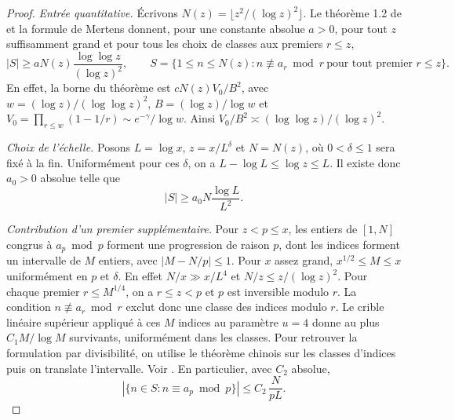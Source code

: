 \documentclass[11pt,a4paper]{article}
\begin{document}
\begin{proof}
\emph{Entrée quantitative.}
Écrivons $N(z)=\lfloor z^2/(\log z)^2\rfloor$. Le théorème 1.2 de
\cite{survivors} et la formule de Mertens donnent, pour une constante
absolue $a>0$, pour tout $z$ suffisamment grand et pour tous les choix de
classes aux premiers $r\le z$,
\[
 |S| \ge a N(z) \frac{\log\log z}{(\log z)^2},
 \qquad S=\{1\le n\le N(z): n\not\equiv a_r\bmod r
                                      \ \text{pour tout premier }r\le z\}.
\]
En effet, la borne du théorème est $cN(z)V_0/B^2$, avec
$w=(\log z)/(\log\log z)^2$, $B=(\log z)/\log w$ et
$V_0=\prod_{r\le w}(1-1/r)\sim e^{-\gamma}/\log w$.
Ainsi $V_0/B^2\asymp(\log\log z)/(\log z)^2$.

\emph{Choix de l'échelle.}
Posons $L=\log x$, $z=x/L^\delta$ et $N=N(z)$, où $0<\delta\le 1$
sera fixé à la fin. Uniformément pour ces $\delta$, on a
$L-\log L\le\log z\le L$. Il existe donc $a_0>0$ absolue telle que
\begin{equation}\label{eq:stock}
                 |S| \ge a_0 N\frac{\log L}{L^2}.
\end{equation}

\emph{Contribution d'un premier supplémentaire.}
Pour $z<p\le x$, les entiers de $[1,N]$ congrus à $a_p\bmod p$
forment une progression de raison $p$, dont les indices forment un
intervalle de $M$ entiers, avec $|M-N/p|\le1$. Pour $x$ assez grand,
$x^{1/2}\le M\le x$ uniformément en $p$ et $\delta$.
En effet $N/x\gg x/L^4$ et $N/z\le z/(\log z)^2$.
Pour chaque premier $r\le M^{1/4}$, on a $r\le z<p$ et $p$ est
inversible modulo $r$. La condition $n\not\equiv a_r\bmod r$ exclut
donc une classe des indices modulo $r$.
Le crible linéaire supérieur appliqué à ces $M$ indices au paramètre
$u=4$ donne au plus $C_1 M/\log M$ survivants, uniformément dans
les classes. Pour retrouver la formulation par divisibilité, on utilise
le théorème chinois sur les classes d'indices puis on translate
l'intervalle. Voir \cite[formule (1)]{granville}. En particulier,
avec $C_2$ absolue,
\begin{equation}\label{eq:class}
        |\{n\in S:n\equiv a_p\bmod p\}|
                      \le C_2\,\frac{N}{pL}.
\end{equation}


\end{proof}
\end{document}
